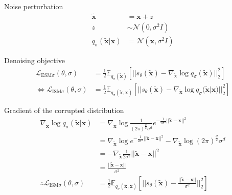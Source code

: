 \documentclass[aspectratio=169,xcolor=dvipsnames]{beamer}
\newcommand{\bx}{\mathbf{x}}
\newcommand{\btx}{\mathbf{\tilde{x}}}
\newcommand{\qs}{q_{\sigma}}
\newcommand{\nbtx}{\nabla_{\btx}}
\begin{document}
\begin{frame}{Noise perturbation}
\pause
\begin{align*}
  \btx &= \bx + z\\
  z &\sim \mathcal{N}(0, \sigma^2 I)\\
    \qs(\btx | \bx) &= \mathcal{N}(\bx, \sigma^2 I)
  \end{align*}
\end{frame}

\begin{frame}{Denoising objective}
  \begin{align*}
    \mathcal{L}_{\text{ESM} \sigma}(\theta, \sigma) &= \frac{1}{2} \mathbb{E}_{\qs(\btx)} \left[|| s_\theta(\btx) - \nbtx \log q_\sigma(\btx) ||_2^2 \right]\\
    \iff \mathcal{L}_{\text{ISM} \sigma}(\theta, \sigma) &= \frac{1}{2} \mathbb{E}_{\qs(\btx, \bx)} \left[ ||s_\theta(\btx) - \nbtx \log q_{\sigma} (\btx | \bx) ||_2^2 \right]
  \end{align*}
\end{frame}

\begin{frame}{Gradient of the corrupted distribution}
  \begin{align*}
    \nbtx \log \qs (\btx | \bx) &= \nbtx \log \frac{1}{(2\pi)^{\frac{d}{2}}  \sigma^d} e^{-\frac{1}{2 \sigma^2} || \btx - \bx||^2}\\
                        &= \nbtx \log e^{-\frac{1}{2 \sigma^2} || \btx - \bx||^2} - \nbtx \log (2\pi)^{\frac{d}{2}} \sigma^d\\
                        &= - \nbtx \frac{1}{2 \sigma^2} || \btx - \bx||^2\\
                        &= \frac{|| \btx - \bx||}{\sigma^2}\\
    \therefore \mathcal{L}_{\text{ISM} \sigma}(\theta, \sigma) &= \frac{1}{2} \mathbb{E}_{\qs(\btx, \bx)} \left[ ||s_\theta(\btx) -  \frac{|| \btx - \bx||}{\sigma^2} ||_2^2 \right]
  \end{align*}
\end{frame}
\end{document}
